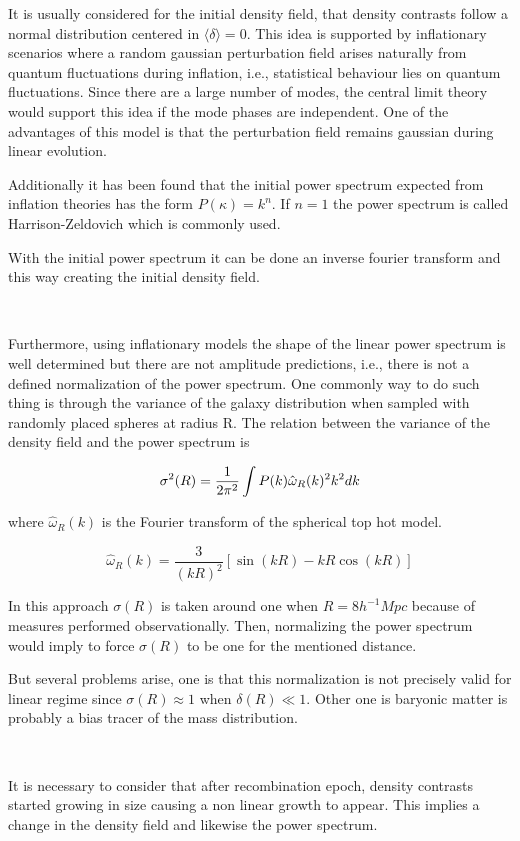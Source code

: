 It is usually considered for the initial density field, that density contrasts 
follow a normal distribution centered in $\langle \delta \rangle = 0$. This idea is supported by
inflationary scenarios where a random gaussian perturbation field arises naturally from quantum 
fluctuations during inflation, i.e., statistical behaviour lies on quantum fluctuations. 
Since there are a large number of modes, the central limit theory 
would support this idea if the mode phases are independent. 
One of the advantages of this model is that the perturbation field remains gaussian during linear evolution. 

Additionally it has been found that the initial power spectrum expected from inflation theories 
has the form $P(\kappa)= k^n$. If $n=1$ the power spectrum is called Harrison-Zeldovich which is 
commonly used. 

With the initial power spectrum it can be done an inverse fourier transform and this way creating the initial density field. 

\

Furthermore, using inflationary models the shape of the linear power spectrum is well 
determined but there are not amplitude predictions, i.e., there is not a defined 
normalization of the power spectrum. 
One commonly way to do such thing is through the variance of the galaxy distribution when
sampled with randomly placed spheres at radius R. The relation between the variance of the 
density field and the power spectrum is

\[
\sigma^2(R) = \frac{1}{2\pi^2} \int P(k)\hat{\omega}_R(k)^2k^2 dk
\]

where $\hat{\omega}_R(k)$ is the Fourier transform of the spherical top hot model.

\[\hat{\omega}_R(k) = \frac{3}{(k R)^2}[\sin(kR)-kR\cos(k R)]\]
 
In this approach $\sigma(R)$ is taken around one when $R=8h^{-1}Mpc$ because of 
measures performed observationally. 
Then, normalizing the power spectrum would imply to force $\sigma(R)$ to be one 
for the mentioned distance.

But several problems arise, one is that this normalization is not precisely valid
for linear regime since $\sigma(R)\approx 1$ when $\delta(R)\ll 1$. Other one is
baryonic matter is probably a bias tracer of the mass distribution. 



\

It is necessary to consider that after recombination epoch, density contrasts started
growing in size causing a non linear growth to appear. This implies a change in the 
density field and likewise the power spectrum. 



